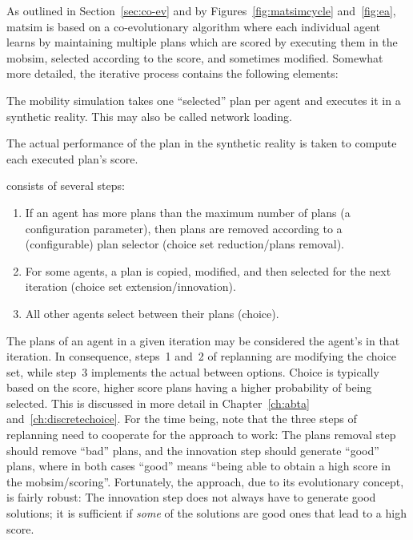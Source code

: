 As outlined in Section~\ref{sec:co-ev} and by Figures~\ref{fig:matsimcycle} and~\ref{fig:ea}, \gls{matsim} is based on a co-evolutionary algorithm where each individual agent learns by maintaining multiple plans which are scored by executing them in the mobsim, selected according to the score, and sometimes modified.  Somewhat more detailed, the iterative process contains the following elements:
%
\begin{description}\styleDescription
\item[mobsim] The mobility simulation takes one ``selected'' plan per agent and executes it in a synthetic reality.  This may also be called network loading.

\item [scoring] The actual performance of the plan in the synthetic reality is taken to compute each executed plan's score.

\item [replanning] consists of several steps:
  \begin{enumerate}\styleEnumerate

  \item If an agent has more plans than the maximum number of plans (a configuration parameter), then plans are removed according to a (configurable) plan selector (choice set reduction/plans removal).

    \item For some agents, a plan is copied, modified, and then selected for the next iteration (choice set extension/innovation).

  \item All other agents select between their plans (choice).
  \end{enumerate}
\end{description}

The plans of an agent in a given iteration may be considered the agent's  in that iteration.  In consequence, steps~1 and~2 of replanning are modifying the choice set, while step~3 implements the actual  between options.
%
Choice is typically based on the score, higher score plans having a higher probability of being selected.  
%
This is discussed in more detail in Chapter~\ref{ch:abta} and~\ref{ch:discretechoice}.  For the time being, note that the three steps of replanning need to cooperate for the approach to work: The plans removal step should remove ``bad'' plans, and the innovation step should generate ``good'' plans, where in both cases ``good'' means ``being able to obtain a high score in the mobsim/scoring''.  Fortunately, the approach, due to its evolutionary concept, is fairly robust: The innovation step does not always have to generate good solutions; it is sufficient if \emph{some} of the solutions are good ones that lead to a high score.

